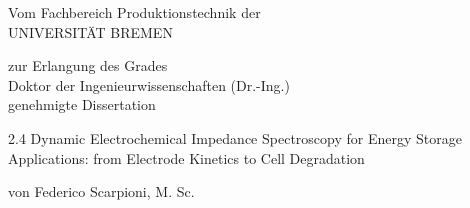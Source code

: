 \begin{titlepage}
\thispagestyle{empty}

\begin{center}


\vspace{2cm}

{\noindent\large
Vom Fachbereich Produktionstechnik der\\[0.5em]
UNIVERSITÄT BREMEN
\par}

\vspace{1cm}


{\noindent\large
zur Erlangung des Grades\\[0.5em]
Doktor der Ingenieurwissenschaften (Dr.-Ing.)\\[0.5em]
genehmigte Dissertation
\par}

\vspace{3cm}

\begin{spacing}{2.4}
{\noindent\Huge
Dynamic Electrochemical Impedance Spectroscopy for Energy Storage Applications:  from Electrode Kinetics to Cell Degradation
}\par
\end{spacing}


\end{center}

\vfill


{\noindent\large
von Federico Scarpioni, M. Sc.  %

\par}

\vspace{1cm}



\end{titlepage}
